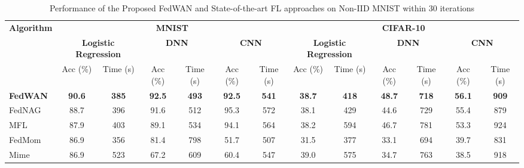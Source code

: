 \documentclass[journal]{IEEEtran}
\begin{document}
\begin{table}[!t]
    \centering
    \small
    \setlength{\tabcolsep}{4pt}
    \caption{Performance of the Proposed FedWAN and State-of-the-art FL approaches on Non-IID MNIST within 30 iterations}
    \begin{tabular}{lcccccc|cccccc}
        \toprule
        \textbf{Algorithm} & \multicolumn{6}{c}{\textbf{MNIST}} & \multicolumn{6}{c}{\textbf{CIFAR-10}} \\
        \cmidrule(lr){2-7} \cmidrule(lr){8-13}
        & \multicolumn{2}{c}{\textbf{Logistic Regression}} & \multicolumn{2}{c}{\textbf{DNN}} & \multicolumn{2}{c}{\textbf{CNN}} 
        & \multicolumn{2}{c}{\textbf{Logistic Regression}} & \multicolumn{2}{c}{\textbf{DNN}} & \multicolumn{2}{c}{\textbf{CNN}} \\
        \cmidrule(lr){2-3} \cmidrule(lr){4-5} \cmidrule(lr){6-7} \cmidrule(lr){8-9} \cmidrule(lr){10-11} \cmidrule(lr){12-13}
        & Acc (\%) & Time (s) & Acc (\%) & Time (s) & Acc (\%) & Time (s) 
        & Acc (\%) & Time (s) & Acc (\%) & Time (s) & Acc (\%) & Time (s) \\
        \midrule
        \textbf{FedWAN}  & \textbf{90.6} & \textbf{385} & \textbf{92.5} & \textbf{493} & \textbf{92.5} & \textbf{541}
                & \textbf{38.7} & \textbf{418} & \textbf{48.7} & \textbf{718} & \textbf{56.1} & \textbf{909} \\
        FedNAG  & 88.7 & 396 & 91.6 & 512 & 95.3 & 572
                & 38.1 & 429 & 44.6 & 729 & 55.4 & 879   \\
        MFL     & 87.9 & 403 & 89.1 & 534 & 94.1 & 564
                & 38.2 & 594 & 46.7 & 781 & 53.3 & 924   \\
        FedMom  & 86.9 & 356 & 81.4 & 798 & 51.7 & 507
                & 31.5 & 377 & 33.1 & 694 & 39.7 & 831  \\
        Mime    & 86.9 & 523 & 67.2 & 609 & 60.4 & 547
                & 39.0 & 575 & 34.7 & 763 & 38.5 & 918  \\
        \bottomrule
    \end{tabular}
    \label{tab:fl-momentum-comparison}
\end{table}
\end{document}
